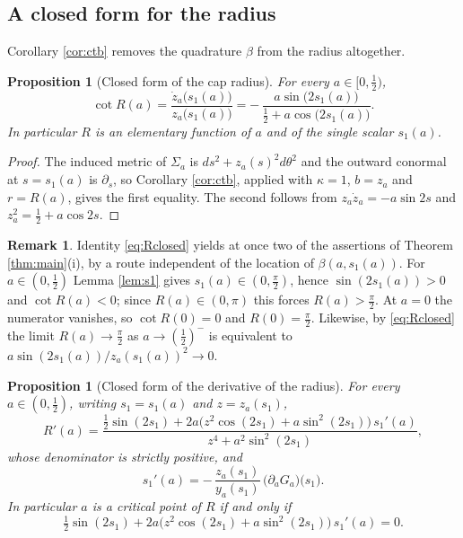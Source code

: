 \documentclass[11pt,a4paper]{amsart}
\theoremstyle{plain}
\newtheorem{proposition}[theorem]{Proposition}
\theoremstyle{definition}
\newtheorem{remark}[theorem]{Remark}
\begin{document}
\subsection*{A closed form for the radius}

Corollary \ref{cor:ctb} removes the quadrature $\beta$ from the radius altogether.

\begin{proposition}[Closed form of the cap radius]\label{prop:Rclosed}
For every $a\in[0,\tfrac12)$,
\begin{equation}\label{eq:Rclosed}
\cot R(a)=\frac{\dot z_a\bigl(s_1(a)\bigr)}{z_a\bigl(s_1(a)\bigr)}=-\,\frac{a\sin\bigl(2s_1(a)\bigr)}{\tfrac12+a\cos\bigl(2s_1(a)\bigr)} .
\end{equation}
In particular $R$ is an elementary function of $a$ and of the single scalar $s_1(a)$.
\end{proposition}

\begin{proof}
The induced metric of $\Sigma_a$ is $ds^2+z_a(s)^2d\theta^2$ and the outward conormal at $s=s_1(a)$ is $\partial_s$, so Corollary \ref{cor:ctb}, applied with $\kappa=1$, $b=z_a$ and $r=R(a)$, gives the first equality. The second follows from $z_a\dot z_a=-a\sin 2s$ and $z_a^2=\tfrac12+a\cos 2s$.
\end{proof}

\begin{remark}\label{rem:Rclosed}
Identity \eqref{eq:Rclosed} yields at once two of the assertions of Theorem \ref{thm:main}(i), by a route independent of the location of $\beta(a,s_1(a))$. For $a\in(0,\tfrac12)$ Lemma \ref{lem:s1} gives $s_1(a)\in(0,\tfrac\pi2)$, hence $\sin(2s_1(a))>0$ and $\cot R(a)<0$; since $R(a)\in(0,\pi)$ this forces $R(a)>\tfrac\pi2$. At $a=0$ the numerator vanishes, so $\cot R(0)=0$ and $R(0)=\tfrac\pi2$. Likewise, by \eqref{eq:Rclosed} the limit $R(a)\to\tfrac\pi2$ as $a\to(\tfrac12)^-$ is equivalent to $a\sin(2s_1(a))/z_a(s_1(a))^2\to 0$.
\end{remark}

\begin{proposition}[Closed form of the derivative of the radius]\label{prop:Rprime}
For every $a\in(0,\tfrac12)$, writing $s_1=s_1(a)$ and $z=z_a(s_1)$,
\begin{equation}\label{eq:Rprime}
R'(a)=\frac{\tfrac12\sin(2s_1)+2a\bigl(z^2\cos(2s_1)+a\sin^2(2s_1)\bigr)\,s_1'(a)}{z^4+a^2\sin^2(2s_1)} ,
\end{equation}
whose denominator is strictly positive, and
\begin{equation}\label{eq:s1prime}
s_1'(a)=-\,\frac{z_a(s_1)}{y_a(s_1)}\,\bigl(\partial_aG_a\bigr)\bigl(s_1\bigr).
\end{equation}
In particular $a$ is a critical point of $R$ if and only if
\begin{equation}\label{eq:critical}
\tfrac12\sin(2s_1)+2a\bigl(z^2\cos(2s_1)+a\sin^2(2s_1)\bigr)\,s_1'(a)=0 .
\end{equation}
\end{proposition}
\end{document}
